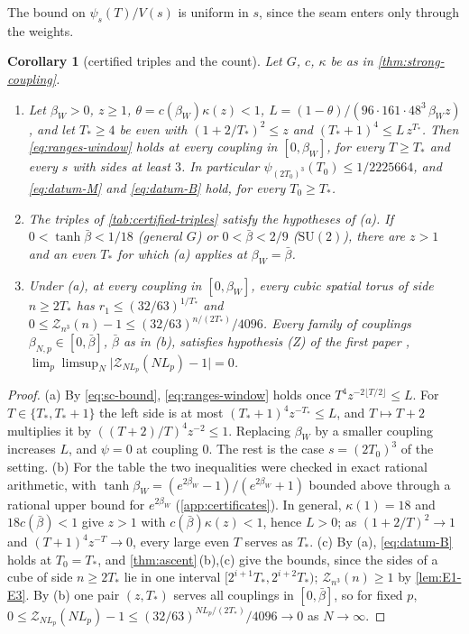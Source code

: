 \documentclass[11pt,a4paper]{amsart}
\newtheorem{corollary}[theorem]{Corollary}
\theoremstyle{definition}
\theoremstyle{remark}
\numberwithin{equation}{section}
\newcommand{\abs}[1]{\lvert #1\rvert}      %
\newcommand{\SU}{\mathrm{SU}}              %
\newcommand{\TT}{\mathbb{T}}               %
\newcommand{\Zc}{\mathcal{Z}}              %
\newcommand{\Zs}[2]{\Zc_{#1}(#2)}          %
\newcommand{\psiT}[2]{\psi_{#1}(#2)}       %
\newcommand{\Vol}[1]{V(#1)}                %
\newcommand{\cube}[1]{(2#1)^3}             %
\newcommand{\Tzero}{T_0}                   %
\newcommand{\Lp}{L_p}                      %
\newcommand{\betaNp}{\beta_{N,p}}          %
\newcommand{\betaW}{\beta_{W}}             %
\begin{document}
The bound on $\psiT{s}{T}/\Vol{s}$ is uniform in $s$, since the seam enters only through the weights.

\begin{corollary}[certified triples and the count]\label{cor:certified-triples}
Let $G$, $c$, $\kappa$ be as in \cref{thm:strong-coupling}.
\begin{enumerate}[label=\textup{(\alph*)},leftmargin=*]
\item Let $\betaW>0$, $z\ge1$, $\theta=c(\betaW)\kappa(z)<1$, $L=(1-\theta)/(96\cdot161\cdot48^3\,\betaW z)$, and let $T_*\ge4$ be even with $(1+2/T_*)^2\le z$ and $(T_*+1)^4\le L\,z^{T_*}$. Then \eqref{eq:ranges-window} holds at every coupling in $[0,\betaW]$, for every $T\ge T_*$ and every $s$ with sides at least $3$. In particular $\psiT{\cube{\Tzero}}{\Tzero}\le1/2225664$, and \eqref{eq:datum-M} and \eqref{eq:datum-B} hold, for every $\Tzero\ge T_*$.
\item The triples of \cref{tab:certified-triples} satisfy the hypotheses of \textup{(a)}. If $0<\tanh\bar\beta<1/18$ (general $G$) or $0<\bar\beta<2/9$ ($\SU(2)$), there are $z>1$ and an even $T_*$ for which \textup{(a)} applies at $\betaW=\bar\beta$.
\item Under \textup{(a)}, at every coupling in $[0,\betaW]$, every cubic spatial torus of side $n\ge2T_*$ has $r_1\le(32/63)^{1/T_*}$ and $0\le\Zs{n^3}{n}-1\le(32/63)^{n/(2T_*)}/4096$. Every family of couplings $\betaNp\in[0,\bar\beta]$, $\bar\beta$ as in \textup{(b)}, satisfies hypothesis \textup{(Z)} of the first paper \cite{bhattacharjee2026first}, $\lim_p\limsup_N\abs{\Zs{N\Lp}{N\Lp}-1}=0$.
\end{enumerate}
\end{corollary}

\begin{proof}
(a) By \eqref{eq:sc-bound}, \eqref{eq:ranges-window} holds once $T^4z^{-2\lfloor T/2\rfloor}\le L$. For $T\in\{T_*,T_*+1\}$ the left side is at most $(T_*+1)^4z^{-T_*}\le L$, and $T\mapsto T+2$ multiplies it by $((T+2)/T)^4z^{-2}\le1$. Replacing $\betaW$ by a smaller coupling increases $L$, and $\psi=0$ at coupling $0$. The rest is the case $s=\cube{\Tzero}$ of the setting.
(b) For the table the two inequalities were checked in exact rational arithmetic, with $\tanh\betaW=(e^{2\betaW}-1)/(e^{2\betaW}+1)$ bounded above through a rational upper bound for $e^{2\betaW}$ (\cref{app:certificates}). In general, $\kappa(1)=18$ and $18c(\bar\beta)<1$ give $z>1$ with $c(\bar\beta)\kappa(z)<1$, hence $L>0$; as $(1+2/T)^2\to1$ and $(T+1)^4z^{-T}\to0$, every large even $T$ serves as $T_*$.
(c) By (a), \eqref{eq:datum-B} holds at $\Tzero=T_*$, and \cref{thm:ascent}\,(b),(c) give the bounds, since the sides of a cube of side $n\ge2T_*$ lie in one interval $[2^{i+1}T_*,2^{i+2}T_*)$; $\Zs{n^3}{n}\ge1$ by \cref{lem:E1-E3}. By (b) one pair $(z,T_*)$ serves all couplings in $[0,\bar\beta]$, so for fixed $p$, $0\le\Zs{N\Lp}{N\Lp}-1\le(32/63)^{N\Lp/(2T_*)}/4096\to0$ as $N\to\infty$.
\end{proof}
\end{document}
